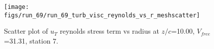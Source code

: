 \begin{figure}[H]
\centering
\texttt{[image: figs/run\_69/run\_69\_turb\_visc\_reynolds\_vs\_r\_meshscatter]}
\caption{Scatter plot of $
u_T$ reynolds stress term vs radius at $z/c$=10.00, $V_{free}$=31.31, station 7.}
\label{fig:run_69_turb_visc_reynolds_vs_r_meshscatter}
\end{figure}


